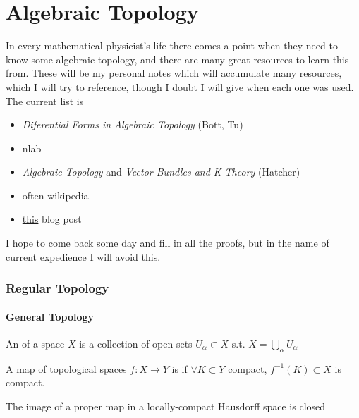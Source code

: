 \documentclass{article}
\begin{document}
\part{Algebraic Topology}
In every mathematical physicist's life there comes a point when they need to know some algebraic topology, and there are many great resources to learn this from. These will be my personal notes which will accumulate many resources, which I will try to reference, though I doubt I will give when each one was used. The current list is 
\begin{itemize} 
	\item \textit{Diferential Forms in Algebraic Topology} (Bott, Tu)
	\item nlab
	\item \textit{Algebraic Topology} and \textit{Vector Bundles and K-Theory} (Hatcher) 
	\item often wikipedia
	\item  \href{https://amathew.wordpress.com/2011/08/05/chern-classes/?fbclid=IwAR28yPxJ8rlcn3DXnWs9ouq9fhrQH9VJ5giZ-JujFziTBD5dvM-pzMzMSig}{this} blog post
\end{itemize} 
I hope to come back some day and fill in all the proofs, but in the name of current expedience I will avoid this. 
\section{Regular Topology} 
\subsection{General Topology}

\begin{definition}
	An  of a space $X$ is a collection of open sets $U_\alpha \subset X$ s.t. $X = \bigcup_\alpha U_\alpha$
\end{definition}

\begin{definition}
	A map of topological spaces $f:X \to Y$ is  if $\forall K \subset Y$ compact, $f^{-1}(K)\subset X$ is compact. 
\end{definition}

\begin{prop}
	The image of a proper map in a locally-compact Hausdorff space is closed
\end{prop}
\end{document}
